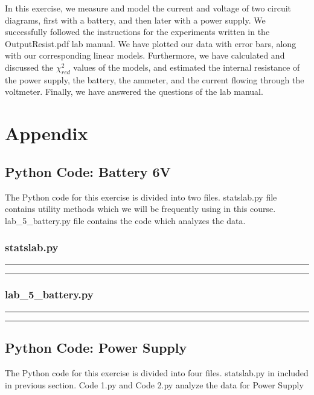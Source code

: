 \documentclass[letterpaper,12pt]{article}
\begin{document}
In this exercise, we measure and model the current and voltage of two circuit diagrams, 
first with a battery, and then later with a power supply. We successfully followed the 
instructions for the experiments written in the OutputResist.pdf lab manual. We have plotted 
our data with error bars, along with our corresponding linear models. Furthermore, 
we have calculated and discussed the $\chi_{red}^2$ values of the models, and estimated 
the internal resistance of the power supply, the battery, the ammeter, and the current 
flowing through the voltmeter. Finally, we have answered the questions of the lab manual. 

\pagebreak

\appendix

\section{Appendix}

\subsection{Python Code: Battery 6V}

The Python code for this exercise is divided into two files. statslab.py file contains utility methods
which we will be frequently using in this course. lab\_5\_battery.py file contains the code which analyzes
the data.

\subsubsection{statslab.py}
\noindent\rule{\textwidth}{1pt}

\noindent\rule{\textwidth}{1pt}

\pagebreak

\subsubsection{lab\_5\_battery.py}
\noindent\rule{\textwidth}{1pt}

\noindent\rule{\textwidth}{1pt}

\pagebreak

\subsection{Python Code: Power Supply}

The Python code for this exercise is divided into four files. statslab.py in included in previous section. Code 1.py and Code 2.py
analyze the data for Power Supply
\end{document}
